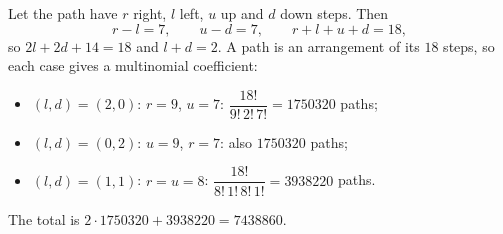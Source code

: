 Let the path have $r$ right, $l$ left, $u$ up and $d$ down steps. Then
\[r-l=7,\qquad u-d=7,\qquad r+l+u+d=18,\]
so $2l+2d+14=18$ and $l+d=2$. A path is an arrangement of its $18$ steps, so each case gives a multinomial coefficient:
\begin{itemize}
\item $(l,d)=(2,0)$: $r=9$, $u=7$: $\dfrac{18!}{9!\,2!\,7!}=1750320$ paths;
\item $(l,d)=(0,2)$: $u=9$, $r=7$: also $1750320$ paths;
\item $(l,d)=(1,1)$: $r=u=8$: $\dfrac{18!}{8!\,1!\,8!\,1!}=3938220$ paths.
\end{itemize}
The total is $2\cdot1750320+3938220=\boxed{7438860}$.
